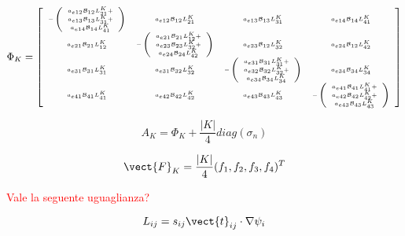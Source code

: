 \begin{equation}
\Phi_K  = 
{
\tiny 
\left[
\begin{array}{cccc}
- \left( \begin{array}{c}
a_{e12}\mathcal{B}_{12}L^K_{21} + \\
a_{e13}\mathcal{B}_{13}L^K_{31} + \\
a_{e14}\mathcal{B}_{14}L^K_{41}
\end{array} \right)

& a_{e12}\mathcal{B}_{12}L^K_{21} 
& a_{e13}\mathcal{B}_{13}L^K_{31}
& a_{e14}\mathcal{B}_{14}L^K_{41}
\\

a_{e21}\mathcal{B}_{21}L^K_{12}
&
- \left( \begin{array}{c}
a_{e21}\mathcal{B}_{21}L^K_{12} + \\
a_{e23}\mathcal{B}_{23}L^K_{32} + \\
a_{e24}\mathcal{B}_{24}L^K_{42}
\end{array} \right)
& a_{e23}\mathcal{B}_{12}L^K_{32}
& a_{e24}\mathcal{B}_{12}L^K_{42}
\\

a_{e31}\mathcal{B}_{31}L^K_{31}
& a_{e31}\mathcal{B}_{32}L^K_{32}
&
- \left( \begin{array}{c}
a_{e31}\mathcal{B}_{31}L^K_{31} + \\
a_{e32}\mathcal{B}_{32}L^K_{32} + \\
a_{e34}\mathcal{B}_{34}L^K_{34}
\end{array} \right)

&a_{e34}\mathcal{B}_{34}L^K_{34}
\\

a_{e41}\mathcal{B}_{41}L^K_{41}
& a_{e42}\mathcal{B}_{42}L^K_{42}
&a_{e43}\mathcal{B}_{43}L^K_{43}
&
- \left( \begin{array}{c}
a_{e41}\mathcal{B}_{41}L^K_{41} + \\
a_{e42}\mathcal{B}_{42}L^K_{42} + \\
a_{e43}\mathcal{B}_{43}L^K_{43}
\end{array} \right)

\end{array}
\right]
}
\end{equation}

\begin{equation}
A_K = \Phi_K + \dfrac{|K|}{4} diag (\sigma_n)
\end{equation}

\begin{equation}
\vect{F}_K = \dfrac{|K|}{4} (f_1,f_2,f_3,f_4)^T
\end{equation}


\textcolor{red}{Vale la seguente uguaglianza?}

\begin{equation}
L_{ij} = s_{ij} \vect{t}_{ij} \cdot \nabla \psi_i
\end{equation}